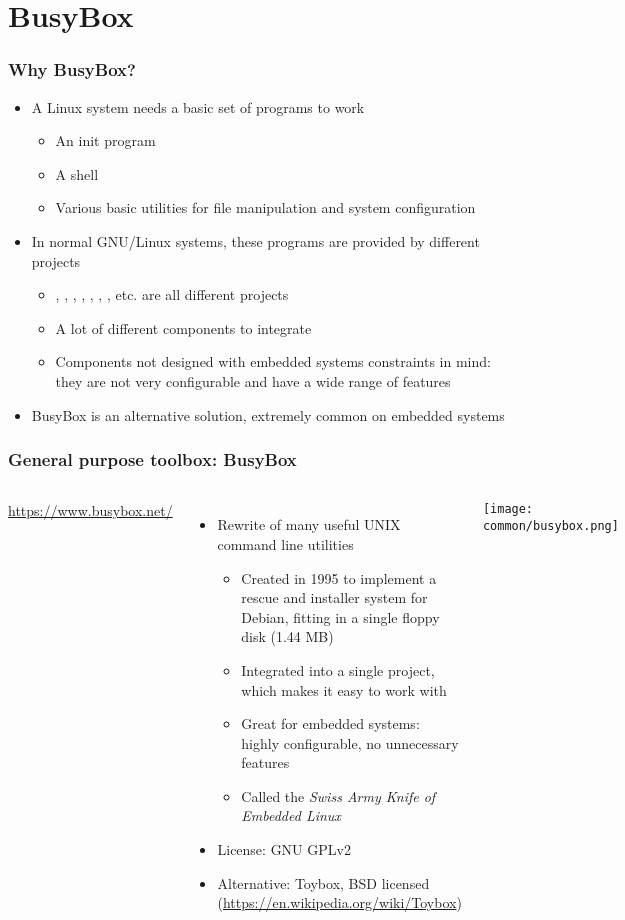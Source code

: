 \section{BusyBox}

\begin{frame}
  \frametitle{Why BusyBox?}
  \begin{itemize}
  \item A Linux system needs a basic set of programs to work
    \begin{itemize}
    \item An init program
    \item A shell
    \item Various basic utilities for file manipulation and system
      configuration
    \end{itemize}
  \item In normal GNU/Linux systems, these programs are provided by
    different projects
    \begin{itemize}
    \item {}, , , ,
      , , , etc. are all different
      projects
    \item A lot of different components to integrate
    \item Components not designed with embedded systems constraints in
      mind: they are not very configurable and have a wide range of
      features
    \end{itemize}
  \item BusyBox is an alternative solution, extremely common on
    embedded systems
  \end{itemize}
\end{frame}

\begin{frame}
  \frametitle{General purpose toolbox: BusyBox}
  \begin{columns}[T]
      \url{https://www.busybox.net/}
      \begin{itemize}
      \item Rewrite of many useful UNIX command line utilities
        \begin{itemize}
        \item Created in 1995 to implement a rescue and installer
         system for Debian, fitting in a single floppy disk (1.44 MB)
        \item Integrated into a single project, which makes it easy to
          work with
        \item Great for embedded systems: highly configurable,
          no unnecessary features
        \item Called the {\em Swiss Army Knife of Embedded Linux}
        \end{itemize}
      \item License: GNU GPLv2
      \item Alternative: Toybox, BSD licensed (\url{https://en.wikipedia.org/wiki/Toybox})
      \end{itemize}
    \texttt{[image: common/busybox.png]}
  \end{columns}
\end{frame}

